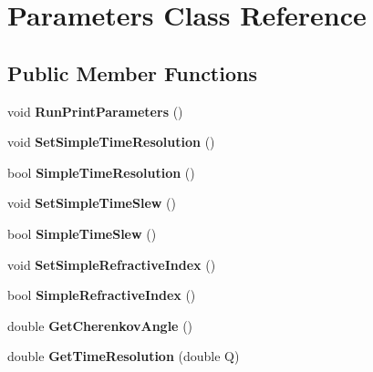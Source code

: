\hypertarget{classParameters}{
\section{Parameters Class Reference}
\label{classParameters}
}
\subsection*{Public Member Functions}
\begin{DoxyCompactItemize}
\item 
\hypertarget{classParameters_ad51d449c4d2963bef72fde2308966d8b}{
void {\bfseries RunPrintParameters} ()}
\label{classParameters_ad51d449c4d2963bef72fde2308966d8b}

\item 
\hypertarget{classParameters_a08f0965d2fe93066d0c550f08716829d}{
void {\bfseries SetSimpleTimeResolution} ()}
\label{classParameters_a08f0965d2fe93066d0c550f08716829d}

\item 
\hypertarget{classParameters_ac1d25752b880deb537aa4344b40dca5e}{
bool {\bfseries SimpleTimeResolution} ()}
\label{classParameters_ac1d25752b880deb537aa4344b40dca5e}

\item 
\hypertarget{classParameters_ac11f733ad0fa1552e523972433cbe0d1}{
void {\bfseries SetSimpleTimeSlew} ()}
\label{classParameters_ac11f733ad0fa1552e523972433cbe0d1}

\item 
\hypertarget{classParameters_aff94a6d602c527a3690cd1e79970b00b}{
bool {\bfseries SimpleTimeSlew} ()}
\label{classParameters_aff94a6d602c527a3690cd1e79970b00b}

\item 
\hypertarget{classParameters_a7c15c7be2a780eb1110ee3767eea4555}{
void {\bfseries SetSimpleRefractiveIndex} ()}
\label{classParameters_a7c15c7be2a780eb1110ee3767eea4555}

\item 
\hypertarget{classParameters_a66a9a682eff6bf1f55aae967da3f7beb}{
bool {\bfseries SimpleRefractiveIndex} ()}
\label{classParameters_a66a9a682eff6bf1f55aae967da3f7beb}

\item 
\hypertarget{classParameters_a593ddf265554ac4fb05f86d9ac82bc7a}{
double {\bfseries GetCherenkovAngle} ()}
\label{classParameters_a593ddf265554ac4fb05f86d9ac82bc7a}

\item 
\hypertarget{classParameters_a754e96439c2c90e10337737055fbae8a}{
double {\bfseries GetTimeResolution} (double Q)}
\label{classParameters_a754e96439c2c90e10337737055fbae8a}


\end{DoxyCompactItemize}
